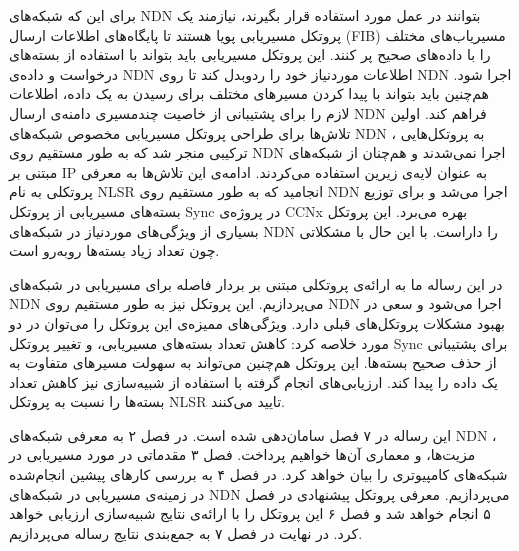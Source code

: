 برای این که شبکه‌های NDN بتوانند در عمل مورد استفاده قرار بگیرند، نیازمند یک پروتکل مسیریابی پویا هستند تا پایگاه‌های اطلاعات ارسال (FIB) مسیریاب‌های مختلف را با داده‌های صحیح پر کنند. این پروتکل مسیریابی باید بتواند با استفاده از بسته‌های درخواست و داده‌ی NDN اطلاعات موردنیاز خود را ردوبدل کند تا روی NDN اجرا شود. هم‌چنین باید بتواند با پیدا کردن مسیرهای مختلف برای رسیدن به یک داده، اطلاعات لازم را برای پشتیبانی از خاصیت چندمسیری دامنه‌ی ارسال NDN فراهم کند. اولین تلاش‌ها برای طراحی پروتکل مسیریابی مخصوص شبکه‌های NDN ، به پروتکل‌هایی ترکیبی منجر شد که به طور مستقیم روی NDN اجرا نمی‌شدند و هم‌چنان از شبکه‌های مبتنی بر IP به عنوان لایه‌ی زیرین استفاده می‌کردند. ادامه‌ی این تلاش‌ها به معرفی پروتکلی به نام NLSR انجامید که به طور مستقیم روی NDN اجرا می‌شد و برای توزیع بسته‌های مسیریابی از پروتکل Sync در پروژه‌ی CCNx 
\cite{ccnx}
بهره می‌برد. این پروتکل بسیاری از ویژگی‌های موردنیاز در شبکه‌های NDN را داراست. با این حال با مشکلاتی چون تعداد زیاد بسته‌ها روبه‌رو است.

در این رساله ما به ارائه‌ی پروتکلی مبتنی بر بردار فاصله برای مسیریابی در شبکه‌های NDN می‌پردازیم. این پروتکل نیز به طور مستقیم روی NDN اجرا می‌شود و سعی در بهبود مشکلات پروتکل‌های قبلی دارد. ویژگی‌های ممیزه‌ی این پروتکل را می‌توان در دو مورد خلاصه کرد: کاهش تعداد بسته‌های مسیریابی، و تغییر پروتکل Sync برای پشتیبانی از حذف صحیح بسته‌ها. این پروتکل هم‌چنین می‌تواند به سهولت مسیرهای متفاوت به یک داده را پیدا کند. ارزیابی‌های انجام گرفته با استفاده از شبیه‌سازی نیز کاهش تعداد بسته‌ها را نسبت به پروتکل NLSR تایید می‌کنند. 

این رساله در ۷ فصل سامان‌دهی شده است. در فصل ۲ به معرفی شبکه‌های NDN ، مزیت‌ها، و معماری آن‌ها خواهیم پرداخت. فصل ۳ مقدماتی در مورد مسیریابی در شبکه‌های کامپیوتری را بیان خواهد کرد. در فصل ۴ به بررسی کارهای پیشین انجام‌شده در زمینه‌ی مسیریابی در شبکه‌های NDN می‌پردازیم. معرفی پروتکل پیشنهادی در فصل ۵ انجام خواهد شد و فصل ۶ این پروتکل را با ارائه‌ی نتایج شبیه‌سازی ارزیابی خواهد کرد. در نهایت در فصل ۷ به جمع‌بندی نتایج رساله می‌پردازیم. 